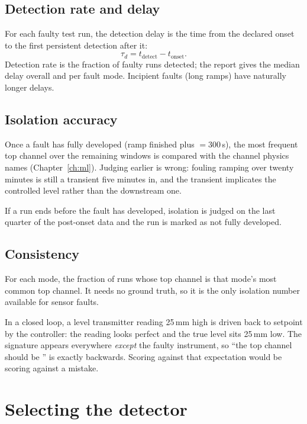 \subsection{Detection rate and delay}
For each faulty test run, the detection delay is the time from the declared
onset to the first persistent detection after it:
\begin{equation}
  \tau_d = t_\text{detect} - t_\text{onset} .
\end{equation}
Detection rate is the fraction of faulty runs detected; the report gives the
median delay overall and per fault mode. Incipient faults (long ramps) have
naturally longer delays.

\subsection{Isolation accuracy}
Once a fault has fully developed (ramp finished plus
 $= 300$\,s), the most frequent top channel over the
remaining windows is compared with the channel physics names
(Chapter~\ref{ch:ml}). Judging earlier is wrong: fouling ramping over twenty
minutes is still a transient five minutes in, and the transient implicates
the controlled level rather than the downstream one.

If a run ends before the fault has developed, isolation is judged on the last
quarter of the post-onset data and the run is marked as not fully developed.

\subsection{Consistency}
For each mode, the fraction of runs whose top channel is that mode's most
common top channel. It needs no ground truth, so it is the only isolation
number available for sensor faults.

\begin{warn}
In a closed loop, a level transmitter reading 25\,mm high is driven back to
setpoint by the controller: the reading looks perfect and the true level sits
25\,mm low. The signature appears everywhere \emph{except} the faulty
instrument, so ``the top channel should be '' is exactly backwards.
Scoring against that expectation would be scoring against a mistake.
\end{warn}

\section{Selecting the detector}

